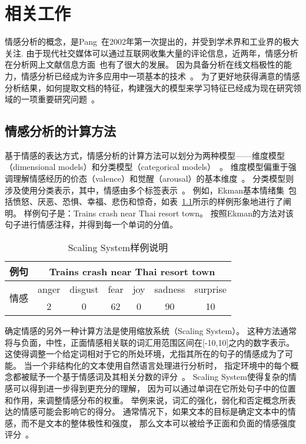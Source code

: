
\chapter{相关工作}

情感分析的概念，是Pang~在2002年第一次提出的，并受到学术界和工业界的极大关注.
由于现代社交媒体可以通过互联网收集大量的评论信息，近两年，情感分析在分析网上文献信息方面~也有了很大的发展。
因为具备分析在线文档极性的能力，情感分析已经成为许多应用中一项基本的技术~。
为了更好地获得满意的情感分析结果，如何提取文档的特征，构建强大的模型来学习特征已经成为现在研究领域的一项重要研究问题~。

\section{情感分析的计算方法}
基于情感的表达方式，情感分析的计算方法可以划分为两种模型——维度模型（dimensional models）和分类模型（categorical models）~。
维度模型偏重于强调理解情感经历的价态（valence）和觉醒（arousal）的基本维度~。
分类模型则涉及使用分类表示，其中，情感由多个标签表示~。
例如，Ekman基本情绪集~包括愤怒、厌恶、恐惧、幸福、悲伤和惊奇，如表~\ref{scaling}所示的样例形象地进行了阐明。
样例句子是：Trains crash near Thai resort town。
按照Ekman的方法对该句子进行情感注释，并得到每一个单词的分值。

\begin{table}[]
    \centering
    \caption{Scaling System样例说明}
    \label{scaling}
    \begin{tabular}{c|c|c|c|c|c|c}
        \hline
        例句 & \multicolumn{6}{c}{Trains crash near Thai resort town} \\ \hline
        \multirow{2}{*}{情感} & anger & disgust & fear & joy & sadness & surprise  \\ \cline{2-7}
        & 2 & 0 & 62 & 0 & 90 & 10        \\ \hline
    \end{tabular}
\end{table}

确定情感的另外一种计算方法是使用缩放系统（Scaling System）。
这种方法通常将与负面，中性，正面情感相关联的词汇用范围区间在[-10,10]之内的数字表示。
这使得调整一个给定词相对于它的所处环境，尤指其所在的句子的情感成为了可能。
当一个非结构化的文本使用自然语言处理进行分析时，
指定环境中的每个概念都被赋予一个基于情感词及其相关分数的评分~。
Scaling System使得复杂的情感可以得到进一步得到更充分的理解，
因为可以通过单词在它所处句子中的位置和作用，来调整情感分布的权重。
举例来说，词汇的强化，弱化和否定概念所表达的情感可能会影响它的得分。
通常情况下，如果文本的目标是确定文本中的情感，而不是文本的整体极性和强度，
那么文本可以被给予正面和负面的情感强度评分~。

